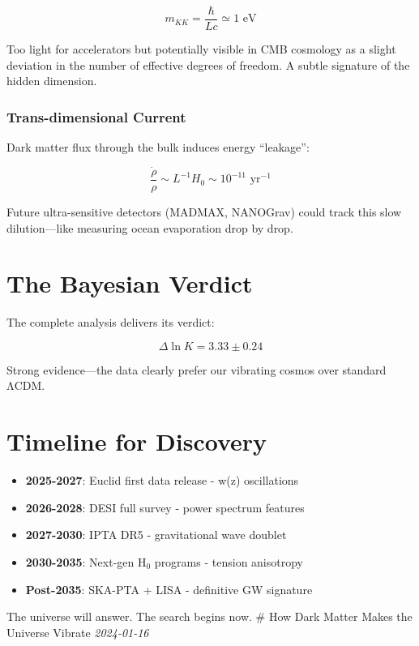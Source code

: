 \documentclass[
  11pt,
]{report}
\providecommand{\tightlist}{%
  \setlength{\itemsep}{0pt}\setlength{\parskip}{0pt}}
\begin{document}
\[m_{KK} = \frac{\hbar}{Lc} \simeq 1 \text{ eV}\]

Too light for accelerators but potentially visible in CMB cosmology as a
slight deviation in the number of effective degrees of freedom. A subtle
signature of the hidden dimension.

\subsubsection{Trans-dimensional
Current}\label{trans-dimensional-current}

Dark matter flux through the bulk induces energy ``leakage'':

\[\frac{\dot{\rho}}{\rho} \sim L^{-1}H_0 \sim 10^{-11} \text{ yr}^{-1}\]

Future ultra-sensitive detectors (MADMAX, NANOGrav) could track this
slow dilution---like measuring ocean evaporation drop by drop.

\section{The Bayesian Verdict}\label{the-bayesian-verdict}

The complete analysis delivers its verdict:

\[\Delta\ln K = 3.33 ± 0.24\]

Strong evidence---the data clearly prefer our vibrating cosmos over
standard ΛCDM.

\section{Timeline for Discovery}\label{timeline-for-discovery}

\begin{itemize}
\tightlist
\item
  \textbf{2025-2027}: Euclid first data release - w(z) oscillations
\item
  \textbf{2026-2028}: DESI full survey - power spectrum features\\
\item
  \textbf{2027-2030}: IPTA DR5 - gravitational wave doublet
\item
  \textbf{2030-2035}: Next-gen H\(_0\) programs - tension anisotropy
\item
  \textbf{Post-2035}: SKA-PTA + LISA - definitive GW signature
\end{itemize}

The universe will answer. The search begins now. \newpage \# How Dark
Matter Makes the Universe Vibrate \emph{2024-01-16}
\end{document}
